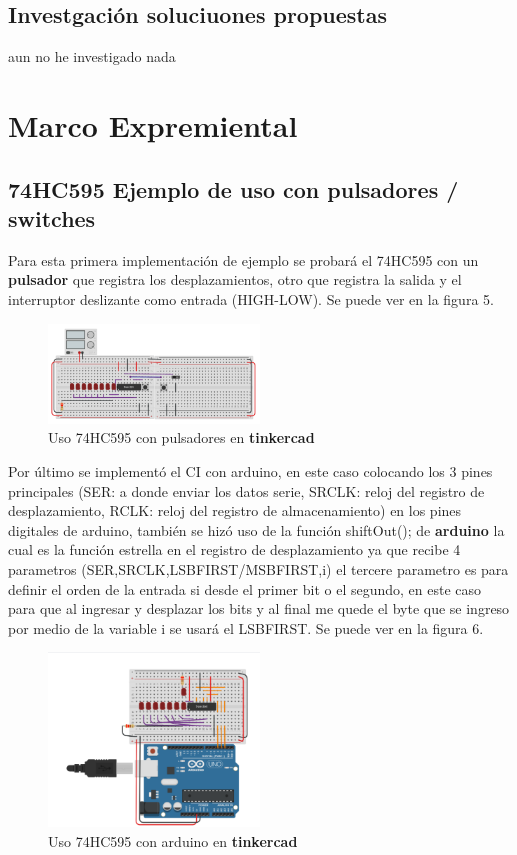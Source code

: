 \documentclass{article}
\begin{document}
\subsection{Investgación soluciuones propuestas}
aun no he investigado nada


\section{Marco Expremiental} \label{practica}
\subsection*{74HC595 Ejemplo de uso con pulsadores / switches}
Para esta primera implementación de ejemplo se probará el 74HC595 con un \textbf{pulsador} \cite{74hc595_pulsador} que registra los desplazamientos, otro que registra la salida y el interruptor deslizante como entrada (HIGH-LOW). Se puede ver en la figura 5.

\begin{figure}[!ht]
\caption{Uso 74HC595 con pulsadores en \textbf{tinkercad} \cite{ejem_74HC595_pulsadores}}
\centering
\includegraphics[width=0.5\textwidth]{ejem_75hc595_pulsadores.png}
\end{figure}

Por último se implementó el CI con arduino, en este caso colocando los 3 pines principales (SER: a donde enviar los datos serie, SRCLK: reloj del registro de desplazamiento, RCLK: reloj del registro de almacenamiento) en los pines digitales de arduino, también se hizó uso de la función shiftOut(); de \textbf{arduino} \cite{shiftOut_arduino}  la cual es la función estrella en el registro de desplazamiento ya que recibe 4 parametros (SER,SRCLK,LSBFIRST/MSBFIRST,i) el tercere parametro es para definir el orden de la entrada si desde el primer bit o el segundo, en este caso para que al ingresar y desplazar los bits y al final me quede el byte que se ingreso por medio de la variable i se usará el LSBFIRST. Se puede ver en la figura 6.

\begin{figure}[!ht]
\caption{Uso 74HC595 con arduino en \textbf{tinkercad} \cite{ejem_74hc595_arduino}}
\centering
\includegraphics[width=0.5\textwidth]{Ejem_74hc595_arduino.png}
\end{figure}
\end{document}
